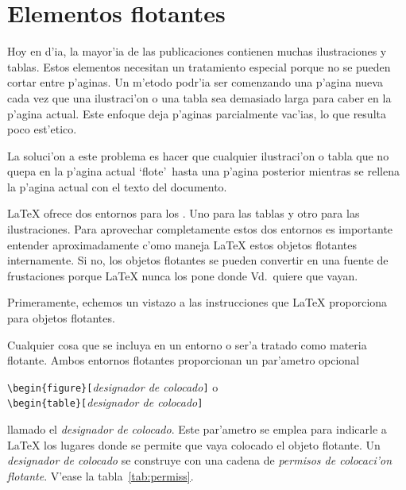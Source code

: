 \section{Elementos flotantes}

Hoy en d'ia, la mayor'ia de las publicaciones contienen muchas
ilustraciones y tablas. Estos elementos necesitan un tratamiento
especial porque no se pueden cortar entre p'aginas. Un m'etodo podr'ia
ser comenzando una p'agina nueva cada vez que una ilustraci'on o una
tabla sea demasiado larga para caber en la p'agina actual. Este
enfoque deja p'aginas parcialmente vac'ias, lo que resulta poco
est'etico.

La soluci'on a este problema es hacer que cualquier ilustraci'on o
tabla que no quepa en la p'agina actual `flote'\ hasta una p'agina
posterior mientras se rellena la p'agina actual con el texto del
documento.

\LaTeX{} ofrece dos entornos para los . Uno
 para las tablas y otro para las ilustraciones. Para aprovechar
 completamente estos dos entornos es importante entender
 aproximadamente c'omo maneja \LaTeX{} estos objetos flotantes
 internamente. Si no, los objetos flotantes se pueden convertir en una
 fuente de frustaciones porque \LaTeX{} nunca los pone donde Vd.\
 quiere que vayan.

\bigskip
Primeramente, echemos un vistazo a las instrucciones que \LaTeX{}
proporciona para objetos flotantes.

Cualquier cosa que se incluya en un entorno  o 
ser'a tratado como materia flotante. Ambos entornos flotantes
proporcionan un par'ametro opcional
\begin{command}
\verb|\begin{figure}[|\emph{designador de colocado}\verb|]| o\\
\verb|\begin{table}[|\emph{designador de colocado}\verb|]|
\end{command}
\noindent llamado el \emph{designador de colocado}. Este par'ametro se
emplea para indicarle a \LaTeX{} los lugares donde se permite que vaya
colocado el objeto flotante. Un \emph{designador de colocado} se
construye con una cadena de \emph{permisos de colocaci'on flotante}.
V'ease la tabla~\ref{tab:permiss}.

